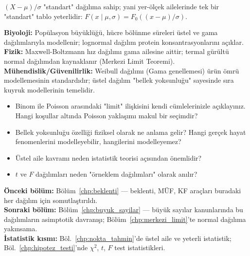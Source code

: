 \begin{onerme}[Standartlaştırma]
$(X - \mu)/\sigma$ "standart" dağılıma sahip; yani yer-ölçek ailelerinde
tek bir "standart" tablo yeterlidir: $F(x \mid \mu, \sigma) = F_0((x-\mu)/\sigma)$.
\end{onerme}

\begin{kopru}
\textbf{Biyoloji:} Popülasyon büyüklüğü, hücre bölünme süreleri üstel ve gama
dağılımlarıyla modellenir; lognormal dağılım protein konsantrasyonlarını açıklar.\\
\textbf{Fizik:} Maxwell-Boltzmann hız dağılımı gama ailesine aittir;
termal gürültü normal dağılımdan kaynaklanır (Merkezi Limit Teoremi).\\
\textbf{Mühendislik/Güvenilirlik:} Weibull dağılımı (Gama genellemesi)
ürün ömrü modellemesinin standardıdır; üstel dağılım "bellek yoksunluğu"
sayesinde sıra kuyruk modellerinin temelidir.
\end{kopru}

\begin{ozyansima}
\begin{itemize}
  \item Binom ile Poisson arasındaki "limit" ilişkisini kendi cümlelerinizle açıklayınız.
        Hangi koşullar altında Poisson yaklaşımı makul bir seçimdir?
  \item Bellek yoksunluğu özelliği fiziksel olarak ne anlama gelir?
        Hangi gerçek hayat fenomenlerini modelleyebilir, hangilerini modelleyemez?
  \item Üstel aile kavramı neden istatistik teorisi açısından önemlidir?
  \item $t$ ve $F$ dağılımları neden "örneklem dağılımları" olarak anılır?
\end{itemize}
\end{ozyansima}

\begin{kopru}
\textbf{Önceki bölüm:} Bölüm~\ref{chp:beklenti} --- beklenti, MÜF, KF araçları
buradaki her dağılım için somutlaştırıldı.\\
\textbf{Sonraki bölüm:} Bölüm~\ref{chp:buyuk_sayilar} --- büyük sayılar kanunlarında
bu dağılımların asimptotik davranışı; Bölüm~\ref{chp:merkezi_limit}'te normal
dağılıma yakınsama.\\
\textbf{İstatistik kısmı:} Böl.~\ref{chp:nokta_tahmin}'de üstel aile ve yeterli
istatistik; Böl.~\ref{chp:hipotez_testi}'nde $\chi^2$, $t$, $F$ test istatistikleri.
\end{kopru}

